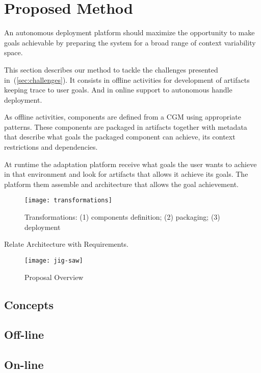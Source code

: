 \section{Proposed Method}
\label{sec:proposal}

An autonomous deployment platform should maximize the opportunity to make goals achievable by preparing the system for a broad range of context variability space.


This section describes our method to tackle the challenges presented in~(\ref{sec:challenges}). It consists in offline activities for development of artifacts keeping trace to user goals. And in online support to autonomous handle deployment.

As offline activities, components are defined from a CGM using appropriate patterns. These components are packaged in artifacts together with metadata that describe what goals the packaged component can achieve, its context restrictions and dependencies.

At runtime the adaptation platform receive what goals the user wants to achieve in that environment and look for artifacts that allows it achieve its goals. The platform them assemble and architecture that allows the goal achievement.

\begin{figure*}[!htb]
  \centering
  \texttt{[image: transformations]}
  \caption{Transformations: (1) components definition; (2) packaging; (3) deployment}
\label{fig:overview}
\end{figure*}


Relate Architecture with Requirements.

\begin{figure}[!htb]
  \centering
  \texttt{[image: jig-saw]}
  \caption{Proposal Overview}
\label{fig:overview}
\end{figure}



\subsection{Concepts}




\subsection{Off-line}
\label{sec:offline}




\subsection{On-line}
\label{sec:online}









